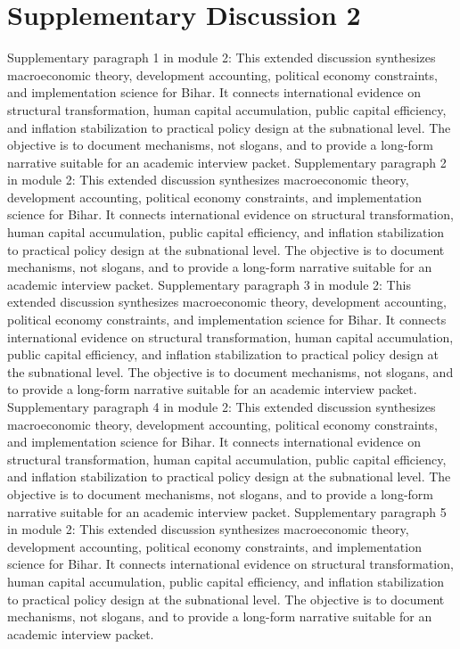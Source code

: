\documentclass[preprint,12pt]{elsarticle}
\begin{document}
\section{Supplementary Discussion 2}
Supplementary paragraph 1 in module 2: This extended discussion synthesizes macroeconomic theory, development accounting, political economy constraints, and implementation science for Bihar. It connects international evidence on structural transformation, human capital accumulation, public capital efficiency, and inflation stabilization to practical policy design at the subnational level. The objective is to document mechanisms, not slogans, and to provide a long-form narrative suitable for an academic interview packet.
Supplementary paragraph 2 in module 2: This extended discussion synthesizes macroeconomic theory, development accounting, political economy constraints, and implementation science for Bihar. It connects international evidence on structural transformation, human capital accumulation, public capital efficiency, and inflation stabilization to practical policy design at the subnational level. The objective is to document mechanisms, not slogans, and to provide a long-form narrative suitable for an academic interview packet.
Supplementary paragraph 3 in module 2: This extended discussion synthesizes macroeconomic theory, development accounting, political economy constraints, and implementation science for Bihar. It connects international evidence on structural transformation, human capital accumulation, public capital efficiency, and inflation stabilization to practical policy design at the subnational level. The objective is to document mechanisms, not slogans, and to provide a long-form narrative suitable for an academic interview packet.
Supplementary paragraph 4 in module 2: This extended discussion synthesizes macroeconomic theory, development accounting, political economy constraints, and implementation science for Bihar. It connects international evidence on structural transformation, human capital accumulation, public capital efficiency, and inflation stabilization to practical policy design at the subnational level. The objective is to document mechanisms, not slogans, and to provide a long-form narrative suitable for an academic interview packet.
Supplementary paragraph 5 in module 2: This extended discussion synthesizes macroeconomic theory, development accounting, political economy constraints, and implementation science for Bihar. It connects international evidence on structural transformation, human capital accumulation, public capital efficiency, and inflation stabilization to practical policy design at the subnational level. The objective is to document mechanisms, not slogans, and to provide a long-form narrative suitable for an academic interview packet.
\end{document}
